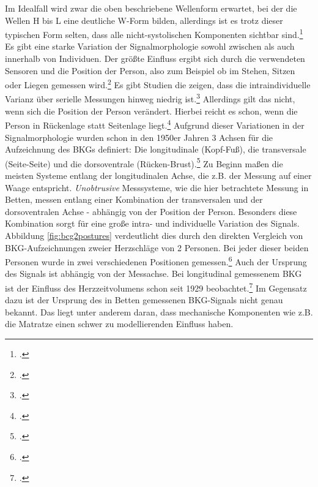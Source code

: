 	Im Idealfall wird zwar die oben beschriebene Wellenform erwartet, bei der die Wellen H bis L eine deutliche W-Form bilden, allerdings ist es trotz dieser typischen Form selten, dass alle nicht-systolischen Komponenten sichtbar sind.\footcite[Vgl.][]{Pinheiro2010} Es gibt eine starke Variation der Signalmorphologie sowohl zwischen als auch innerhalb von Individuen. Der größte Einfluss ergibt sich durch die verwendeten Sensoren und die Position der Person, also zum Beispiel ob im Stehen, Sitzen oder Liegen gemessen wird.\footcite[Vgl.][]{Sadek2019} Es gibt Studien die zeigen, dass die intraindividuelle Varianz über serielle Messungen hinweg niedrig ist.\footcite[Vgl.][]{Inan2015} Allerdings gilt das nicht, wenn sich die Position der Person verändert. Hierbei reicht es schon, wenn die Person in Rückenlage statt Seitenlage liegt.\footcite[Vgl.][]{Bruser2011} Aufgrund dieser Variationen in der Signalmorphologie wurden schon in den 1950er Jahren 3 Achsen für die Aufzeichnung des \ac{BKG}s definiert: Die longitudinale (Kopf-Fuß), die transversale (Seite-Seite) und die dorsoventrale (Rücken-Brust).\footcite[][Vgl.]{Bruser2011, Inan2015} Zu Beginn maßen die meisten Systeme entlang der longitudinalen Achse, die z.B. der Messung auf einer Waage entspricht. \textit{Unobtrusive} Messsysteme, wie die hier betrachtete Messung in Betten, messen entlang einer Kombination der transversalen und der dorsoventralen Achse - abhängig von der Position der Person. Besonders diese Kombination sorgt für eine große intra- und individuelle Variation des Signals. Abbildung \ref{fig:bcg2postures} verdeutlicht dies durch den direkten Vergleich von \ac{BKG}-Aufzeichnungen zweier Herzschläge von 2 Personen. Bei jeder dieser beiden Personen wurde in zwei verschiedenen Positionen gemessen.\footcite{Bruser2011} Auch der Ursprung des Signals ist abhängig von der Messachse. Bei longitudinal gemessenem \ac{BKG} ist der Einfluss des Herzzeitvolumens schon seit 1929 beobachtet.\footcite[Vgl.][]{Starr1939} Im Gegensatz dazu ist der Ursprung des in Betten gemessenen \ac{BKG}-Signals nicht genau bekannt. Das liegt unter anderem daran, dass mechanische Komponenten wie z.B. die Matratze einen schwer zu modellierenden Einfluss haben.
	
